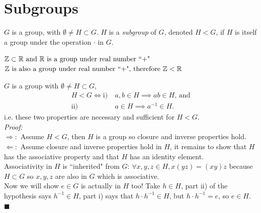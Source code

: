 \section{Subgroups}
\begin{definition}[Subgroups]
$G$ is a group, with $\emptyset \neq H \subset G$. $H$ is a \textit{subgroup} of $G$, denoted $H < G$, if $H$ is itself a group under the operation $\cdot$ in $G$.
\end{definition}

\begin{example} 
${\mathbb{ Z}}\subset {\mathbb{ R}} \text{ and }{\mathbb{ R}}\text{ is a group under real number ``+"}$\\
${\mathbb{ Z}} \text{ is also a group under real number ``+", therefore } {\mathbb{ Z}} < {\mathbb{ R}}$
\end{example}
\begin{lemma}[(Used in HW\# 3)]
$G$ is a group with $\emptyset\neq H\subset G$, \\
\begin{align}
    H<G \iff \text{i)}& \ a,b\in H \implies ab\in H \nonumber\text{, and}\\
             \text{ii)}& \ a\in H \implies a^{-1}\in H. \nonumber 
\end{align}
i.e. these two properties are necessary and sufficient for $H<G$.\\
\textit{Proof:} \\
\noindent $\Rightarrow:$ Assume $H<G$, then $H$ is a group so closure and inverse properties hold.\steezybreak\\
\noindent $\Leftarrow:$ Assume closure and inverse properties hold in $H$, it remains to show that $H$ has the associative property and that $H$ has an identity element.\steezybreak\\
\noindent Associativity in $H$ is ``inherited" from $G$: $\forall x,y,z \in H, x(yz)=(xy)z$ because $H\subset G$ so $x,y,z$ are also in $G$ which is associative.\steezybreak\\
\noindent Now we will show $e\in G$ is actually in $H$ too! Take $h\in H$, part ii) of the hypothesis says $h^{-1}\in H$, part i) says that $h\cdot h^{-1}\in H$, but $h\cdot h^{-1}=e$, so $e\in H$. $\blacksquare$
\end{lemma}

